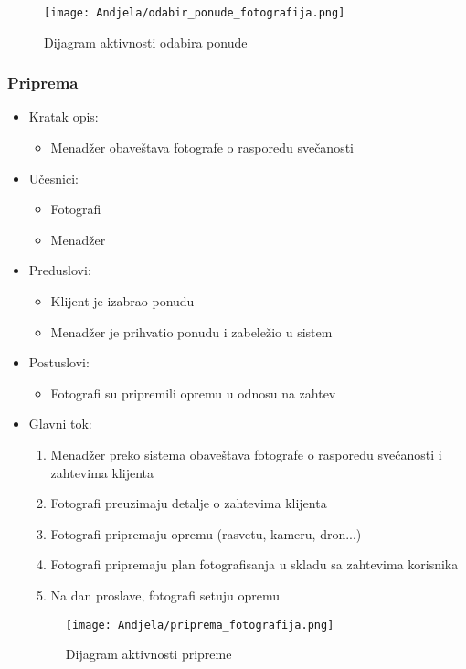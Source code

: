 \documentclass[a4paper]{article}
\begin{document}
\begin{itemize}
    \begin{figure}[H]
    \centering
    \texttt{[image: Andjela/odabir\_ponude\_fotografija.png]}
    \caption{Dijagram aktivnosti odabira ponude}
    \label{fig:RegistracijaZ}
\end{figure}
        
\end{itemize}

\subsubsection{Priprema}
\begin{itemize}
    \item Kratak opis: 
    \begin{itemize}
        \item Menadžer obaveštava fotografe o rasporedu svečanosti
    \end{itemize}
    \item Učesnici:
        \begin{itemize}
        \item Fotografi
        \item Menadžer
    \end{itemize}
    \item Preduslovi:
        \begin{itemize}
            \item Klijent je izabrao ponudu
            \item Menadžer je prihvatio ponudu i zabeležio u sistem
        \end{itemize}
    \item Postuslovi:
        \begin{itemize}
            \item Fotografi su pripremili opremu u odnosu na zahtev
        \end{itemize}
    \item Glavni tok:
        \begin{enumerate}
            \item Menadžer preko sistema obaveštava fotografe o rasporedu svečanosti i zahtevima klijenta
            \item Fotografi preuzimaju detalje o zahtevima klijenta
            \item Fotografi pripremaju opremu (rasvetu, kameru, dron...)
            \item Fotografi pripremaju plan fotografisanja u skladu sa zahtevima korisnika
            \item Na dan proslave, fotografi setuju opremu
        \end{enumerate}
        
        \begin{figure}[H]
    \centering
\texttt{[image: Andjela/priprema\_fotografija.png]}
    \caption{Dijagram aktivnosti pripreme}
    \label{fig:RegistracijaZ}
\end{figure}
        
        
\end{itemize}
\end{document}
